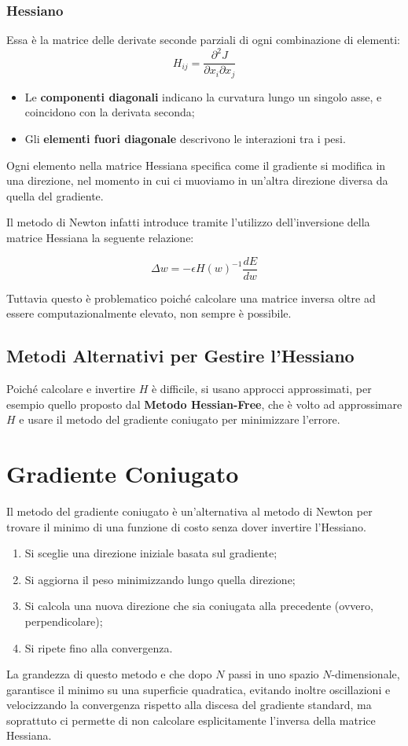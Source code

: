 \subsubsection{Hessiano}
Essa è la matrice delle derivate seconde parziali di ogni combinazione di elementi:
\begin{equation}
H_{ij} = \frac{\partial^2 J}{\partial x_i \partial x_j}
\end{equation}
\begin{itemize}
    \item Le \textbf{componenti diagonali} indicano la curvatura lungo un singolo asse, e coincidono con la derivata seconda;
    \item Gli \textbf{elementi fuori diagonale} descrivono le interazioni tra i pesi.
\end{itemize}
Ogni elemento nella matrice Hessiana specifica come il gradiente si modifica in una direzione, nel momento in cui ci muoviamo in un'altra direzione diversa da quella del gradiente.

Il metodo di Newton infatti introduce tramite l'utilizzo dell'inversione della matrice Hessiana la seguente relazione:

\begin{equation}
    \Delta w = -\epsilon H(w)^{-1}\frac{d E}{d w}
\end{equation}

Tuttavia questo è problematico poiché calcolare una matrice inversa oltre ad essere computazionalmente elevato, non sempre è possibile.

\subsection{Metodi Alternativi per Gestire l'Hessiano}
Poiché calcolare e invertire \( H \) è difficile, si usano approcci approssimati, per esempio quello proposto dal \textbf{Metodo Hessian-Free}, che è volto ad approssimare \( H \) e usare il metodo del gradiente coniugato per minimizzare l'errore.

\section{Gradiente Coniugato}
Il metodo del gradiente coniugato è un'alternativa al metodo di Newton per trovare il minimo di una funzione di costo senza dover invertire l'Hessiano. 
\begin{enumerate}
    \item Si sceglie una direzione iniziale basata sul gradiente;
    \item Si aggiorna il peso minimizzando lungo quella direzione;
    \item Si calcola una nuova direzione che sia coniugata alla precedente (ovvero, perpendicolare);
    \item Si ripete fino alla convergenza.
\end{enumerate}

La grandezza di questo metodo e che dopo \( N \) passi in uno spazio \( N \)-dimensionale, garantisce il minimo su una superficie quadratica, evitando inoltre oscillazioni e velocizzando la convergenza rispetto alla discesa del gradiente standard, ma soprattuto ci permette di non calcolare esplicitamente l'inversa della matrice Hessiana.
